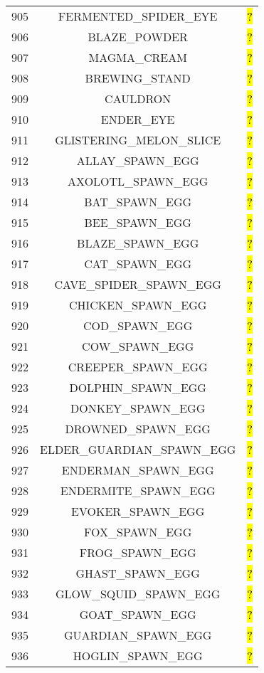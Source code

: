 \documentclass[11pt]{article}
\newcommand\myworries[1]{\sethlcolor{red}\hl{#1}}
\begin{document}
\begin{longtable}{ |c|c|c| }
905 & FERMENTED\_SPIDER\_EYE & \myworries{?} \\
906 & BLAZE\_POWDER & \myworries{?} \\
907 & MAGMA\_CREAM & \myworries{?} \\
908 & BREWING\_STAND & \myworries{?} \\
909 & CAULDRON & \myworries{?} \\
910 & ENDER\_EYE & \myworries{?} \\
911 & GLISTERING\_MELON\_SLICE & \myworries{?} \\
912 & ALLAY\_SPAWN\_EGG & \myworries{?} \\
913 & AXOLOTL\_SPAWN\_EGG & \myworries{?} \\
914 & BAT\_SPAWN\_EGG & \myworries{?} \\
915 & BEE\_SPAWN\_EGG & \myworries{?} \\
916 & BLAZE\_SPAWN\_EGG & \myworries{?} \\
917 & CAT\_SPAWN\_EGG & \myworries{?} \\
918 & CAVE\_SPIDER\_SPAWN\_EGG & \myworries{?} \\
919 & CHICKEN\_SPAWN\_EGG & \myworries{?} \\
920 & COD\_SPAWN\_EGG & \myworries{?} \\
921 & COW\_SPAWN\_EGG & \myworries{?} \\
922 & CREEPER\_SPAWN\_EGG & \myworries{?} \\
923 & DOLPHIN\_SPAWN\_EGG & \myworries{?} \\
924 & DONKEY\_SPAWN\_EGG & \myworries{?} \\
925 & DROWNED\_SPAWN\_EGG & \myworries{?} \\
926 & ELDER\_GUARDIAN\_SPAWN\_EGG & \myworries{?} \\
927 & ENDERMAN\_SPAWN\_EGG & \myworries{?} \\
928 & ENDERMITE\_SPAWN\_EGG & \myworries{?} \\
929 & EVOKER\_SPAWN\_EGG & \myworries{?} \\
930 & FOX\_SPAWN\_EGG & \myworries{?} \\
931 & FROG\_SPAWN\_EGG & \myworries{?} \\
932 & GHAST\_SPAWN\_EGG & \myworries{?} \\
933 & GLOW\_SQUID\_SPAWN\_EGG & \myworries{?} \\
934 & GOAT\_SPAWN\_EGG & \myworries{?} \\
935 & GUARDIAN\_SPAWN\_EGG & \myworries{?} \\
936 & HOGLIN\_SPAWN\_EGG & \myworries{?} \\

\end{longtable}
\end{document}
